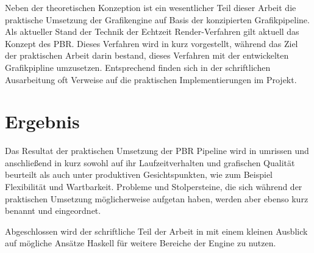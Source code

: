 Neben der theoretischen Konzeption ist ein wesentlicher Teil dieser Arbeit die praktische Umsetzung der Grafikengine auf Basis der konzipierten Grafikpipeline. Als aktueller Stand der Technik der Echtzeit Render-Verfahren gilt aktuell das Konzept des \ac{PBR}. Dieses Verfahren wird in  kurz vorgestellt, während das Ziel der praktischen Arbeit darin bestand, dieses Verfahren mit der entwickelten Grafikpipline umzusetzen. Entsprechend finden sich in der schriftlichen Ausarbeitung oft Verweise auf die praktischen Implementierungen im Projekt.

\section{Ergebnis}
Das Resultat der praktischen Umsetzung der \ac{PBR} Pipeline wird in  umrissen und anschließend in  kurz sowohl auf ihr Laufzeitverhalten und grafischen Qualität beurteilt als auch unter produktiven Gesichtspunkten, wie zum Beispiel Flexibilität und Wartbarkeit. Probleme und Stolpersteine, die sich während der praktischen Umsetzung möglicherweise aufgetan haben, werden aber ebenso kurz benannt und eingeordnet.

Abgeschlossen wird der schriftliche Teil der Arbeit in  mit einem kleinen Ausblick auf mögliche Ansätze Haskell für weitere Bereiche der Engine zu nutzen.
